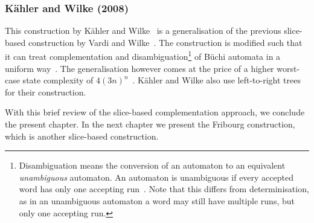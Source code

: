 
\subsubsection{Kähler and Wilke (2008)}
\label{2_kw08}
This construction by Kähler and Wilke~\cite{2008_kaehler} is a generalisation of the previous slice-based construction by Vardi and Wilke~\cite{vardi2007automata}. The construction is modified such that it can treat complementation and disambiguation\footnote{Disambiguation means the conversion of an automaton to an equivalent \textit{unambiguous} automaton. An automaton is unambiguous if every accepted word has only one accepting run~\cite{2012_mohri}. Note that this differs from determinisation, as in an unambiguous automaton a word may still have multiple runs, but only one accepting run.} of Büchi automata in a uniform way~\cite{2011_tsai}. The generalisation however comes at the price of a higher worst-case state complexity of $4(3n)^n$~\cite{2011_tsai}. Kähler and Wilke also use left-to-right trees for their construction.




With this brief review of the slice-based complementation approach, we conclude the present chapter. In the next chapter we present the Fribourg construction, which is another slice-based construction. 


